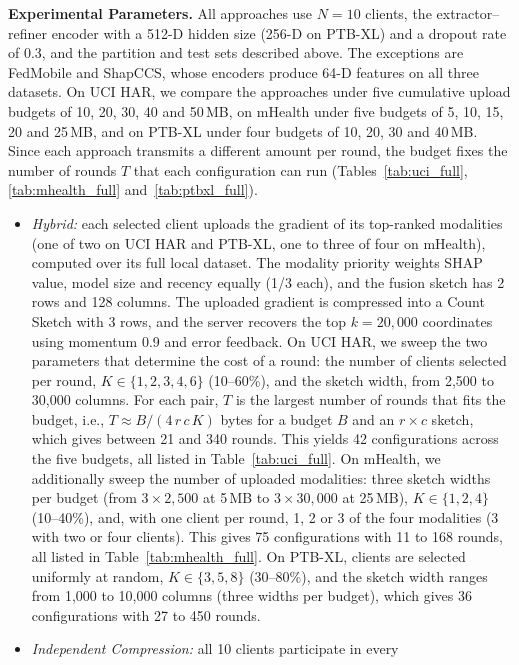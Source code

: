 \documentclass[sigconf]{acmart}
\newcommand{\method}{Hybrid}   %
\begin{document}
\textbf{Experimental Parameters.}
All approaches use $N=10$ clients, the extractor--refiner encoder with a 512-D
hidden size (256-D on PTB-XL) and a dropout rate of 0.3, and the partition and test sets described
above. The exceptions are FedMobile and ShapCCS, whose encoders produce 64-D
features on all three datasets. On UCI HAR, we compare the approaches under five cumulative upload
budgets of 10, 20, 30, 40 and 50\,MB, on mHealth under five budgets of 5, 10,
15, 20 and 25\,MB, and on PTB-XL under four budgets of 10, 20, 30 and 40\,MB.
Since each approach transmits a different amount per round, the budget fixes
the number of rounds $T$ that each configuration can run
(Tables~\ref{tab:uci_full}, \ref{tab:mhealth_full} and~\ref{tab:ptbxl_full}).
\begin{itemize}
  \item \textit{\method:} each selected client uploads the gradient of its
  top-ranked modalities (one of two on UCI HAR and PTB-XL, one to three of four on mHealth), computed over its full
  local dataset. The modality priority weights SHAP value, model size and
  recency equally (1/3 each), and the fusion sketch has 2 rows and 128 columns.
  The uploaded gradient is compressed into a Count Sketch with 3 rows, and the
  server recovers the top $k = 20{,}000$ coordinates using momentum 0.9 and
  error feedback. On UCI HAR, we sweep the two parameters that determine the
  cost of a round: the number of clients selected per round,
  $K\in\{1,2,3,4,6\}$ (10--60\%), and the sketch width, from 2,500 to 30,000
  columns. For each pair, $T$ is the largest number of rounds that fits the
  budget, i.e., $T \approx B / (4\,r\,c\,K)$ bytes for a budget $B$ and an
  $r\times c$ sketch, which gives between 21 and 340 rounds. This yields 42
  configurations across the five budgets, all listed in
  Table~\ref{tab:uci_full}. On mHealth, we additionally sweep the number of
  uploaded modalities: three sketch widths per budget (from $3\times2{,}500$ at
  5\,MB to $3\times30{,}000$ at 25\,MB), $K\in\{1,2,4\}$ (10--40\%), and, with
  one client per round, 1, 2 or 3 of the four modalities (3 with two or four
  clients). This gives 75 configurations with 11 to 168 rounds, all listed in
  Table~\ref{tab:mhealth_full}. On PTB-XL, clients are
  selected uniformly at random, $K\in\{3,5,8\}$ (30--80\%), and the sketch
  width ranges from 1,000 to 10,000 columns (three widths per budget), which
  gives 36 configurations with 27 to 450 rounds.
  \item \textit{Independent Compression:} all 10 clients participate in every

\end{itemize}
\end{document}
